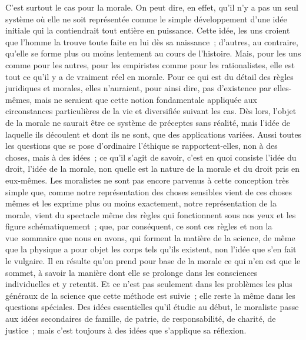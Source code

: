 \documentclass[french,twoside]{book} %
\begin{document}
C’est surtout le cas pour la morale. On peut dire, en effet, qu’il n’y a pas un seul système où elle ne soit représentée comme le simple développement d’une idée initiale qui la contiendrait tout entière en puissance. Cette idée, les uns croient que l’homme la trouve toute faite en lui dès sa naissance ; d’autres, au contraire, qu’elle se forme plus ou moins lentement au cours de l’histoire. Mais, pour les uns comme pour les autres, pour les empiristes comme pour les rationalistes, elle est tout ce qu’il y a de vraiment réel en morale. Pour ce qui est du détail des règles juridiques et morales, elles n’auraient, pour ainsi dire, pas d’existence par elles-mêmes, mais ne seraient que cette notion fondamentale appliquée aux circonstances particulières de la vie et diversifiée suivant les cas. Dès lors, l’objet de la morale ne saurait être ce système de préceptes sans réalité, mais l’idée de laquelle ils découlent et dont ils ne sont, que des applications variées. Aussi toutes les questions que se pose d’ordinaire l’éthique se rapportent-elles, non à des choses, mais à des idées ; ce qu’il s’agit de savoir, c’est en quoi consiste l’idée du droit, l’idée de la morale, non quelle est la nature de la morale et du droit pris en eux-mêmes. Les moralistes ne sont pas encore parvenus à cette conception très simple que, comme notre représentation des choses sensibles vient de ces choses mêmes et les exprime plus ou moins exactement, notre représentation de la morale, vient du spectacle même des règles qui fonctionnent sous nos yeux et les figure schématiquement ; que, par conséquent, ce sont ces règles et non la vue sommaire que nous en avons, qui forment la matière de la science, de même que la physique a pour objet les corps tels qu’ils existent, non l’idée que s’en fait le vulgaire. Il en résulte qu’on prend pour base de la morale ce qui n’en est que le sommet, à savoir la manière dont elle se prolonge dans les consciences individuelles et y retentit. Et ce n’est pas seulement dans les problèmes les plus généraux de la science que cette méthode est suivie ; elle reste la même dans les questions spéciales. Des idées essentielles qu’il étudie au début, le moraliste passe aux idées secondaires de famille, de patrie, de responsabilité, de charité, de justice ; mais c’est toujours à des idées que s’applique sa réflexion.\par
\end{document}
